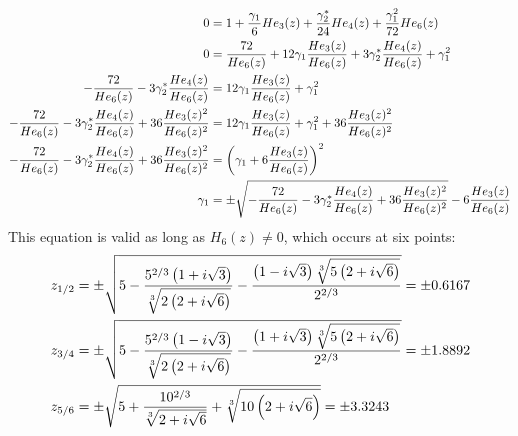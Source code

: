 \begin{align}
    0 &= 1+\frac{\gamma_1}{6}He_3(z) + \frac{\gamma_2^*}{24}He_4(z) + \frac{\gamma_1^2}{72}He_6(z) \\
    0 &= \frac{72}{He_6(z)} + 12\gamma_1\frac{He_3(z)}{He_6(z)} + 3\gamma_2^*\frac{He_4(z)}{He_6(z)} + \gamma_1^2 \notag \\
    -\frac{72}{He_6(z)} - 3\gamma_2^*\frac{He_4(z)}{He_6(z)} &=  12\gamma_1\frac{He_3(z)}{He_6(z)} + \gamma_1^2 \notag \\
    -\frac{72}{He_6(z)} - 3\gamma_2^*\frac{He_4(z)}{He_6(z)} + 36\frac{He_3(z)^2}{He_6(z)^2} &= 12\gamma_1\frac{He_3(z)}{He_6(z)} + \gamma_1^2 + 36\frac{He_3(z)^2}{He_6(z)^2} \notag \\
    -\frac{72}{He_6(z)} - 3\gamma_2^*\frac{He_4(z)}{He_6(z)} + 36\frac{He_3(z)^2}{He_6(z)^2} &= \left(\gamma_1+6\frac{He_3(z)}{He_6(z)}\right)^2 \notag \\
    \gamma_1 &= \pm\sqrt{-\frac{72}{He_6(z)} - 3\gamma_2^*\frac{He_4(z)}{He_6(z)} + 36\frac{He_3(z)^2}{He_6(z)^2}} - 6\frac{He_3(z)}{He_6(z)} \notag
\end{align} %
This equation is valid as long as $H_6(z) \neq 0$, which occurs at six points:
\begin{align}
    z_{1/2} &= \pm \sqrt{5-\frac{5^{2/3}\left(1+i\sqrt{3}\right)}{\sqrt[3]{2\left(2+i\sqrt{6}\right)}} - \frac{\left(1-i\sqrt{3}\right)\sqrt[3]{5\left(2+i\sqrt{6}\right)}}{2^{2/3}}} = \pm 0.6167 \notag\\
    z_{3/4} &= \pm \sqrt{5-\frac{5^{2/3}\left(1-i\sqrt{3}\right)}{\sqrt[3]{2\left(2+i\sqrt{6}\right)}} - \frac{\left(1+i\sqrt{3}\right)\sqrt[3]{5\left(2+i\sqrt{6}\right)}}{2^{2/3}}} = \pm 1.8892 \notag \\
    z_{5/6} &= \pm \sqrt{5+\frac{10^{2/3}}{\sqrt[3]{2+i\sqrt{6}}} + \sqrt[3]{10\left(2+i\sqrt{6}\right)}} = \pm 3.3243 \notag
\end{align}

